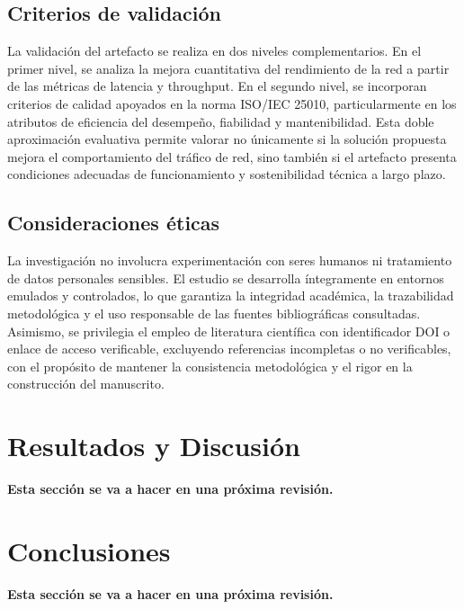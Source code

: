 \documentclass[12pt,a4paper]{article}
\newcommand{\revisionpendiente}{
    \begin{center}
    \setlength{\fboxsep}{8pt}
    \colorbox{yellow!45}{
        \parbox{0.9\linewidth}{
            \centering \textbf{Esta sección se va a hacer en una próxima revisión.}
        }
    }
    \end{center}
}
\begin{document}
\subsection{Criterios de validación}
La validación del artefacto se realiza en dos niveles complementarios. En el primer nivel, se analiza la mejora cuantitativa del rendimiento de la red a partir de las métricas de latencia y throughput. En el segundo nivel, se incorporan criterios de calidad apoyados en la norma ISO/IEC 25010, particularmente en los atributos de eficiencia del desempeño, fiabilidad y mantenibilidad. Esta doble aproximación evaluativa permite valorar no únicamente si la solución propuesta mejora el comportamiento del tráfico de red, sino también si el artefacto presenta condiciones adecuadas de funcionamiento y sostenibilidad técnica a largo plazo.
\subsection{Consideraciones éticas}
La investigación no involucra experimentación con seres humanos ni tratamiento de datos personales sensibles. El estudio se desarrolla íntegramente en entornos emulados y controlados, lo que garantiza la integridad académica, la trazabilidad metodológica y el uso responsable de las fuentes bibliográficas consultadas. Asimismo, se privilegia el empleo de literatura científica con identificador DOI o enlace de acceso verificable, excluyendo referencias incompletas o no verificables, con el propósito de mantener la consistencia metodológica y el rigor en la construcción del manuscrito.


\section{Resultados y Discusión}

\revisionpendiente

\section{Conclusiones}

\revisionpendiente

\printbibliography[title={Referencias Bibliográficas}]
\end{document}
